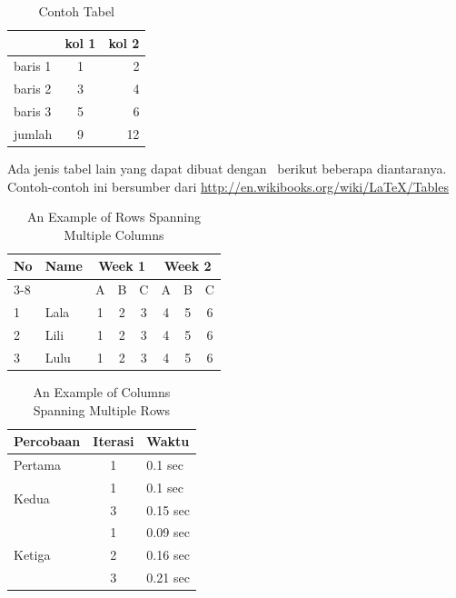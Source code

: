 \begin{table}
	\centering
	\caption{Contoh Tabel}
	\label{tab:tab1}
	\begin{tabular}{| l | c r |}
		\hline
		& kol 1 & kol 2 \\ 
		\hline
		baris 1 & 1 & 2 \\
		baris 2 & 3 & 4 \\
		baris 3 & 5 & 6 \\
		jumlah  & 9 & 12 \\
		\hline
	\end{tabular}
\end{table}

Ada jenis tabel lain yang dapat dibuat dengan \latex~berikut 
beberapa diantaranya. 
Contoh-contoh ini bersumber dari 
\url{http://en.wikibooks.org/wiki/LaTeX/Tables}

\begin{table}
	\centering
	\caption{An Example of Rows Spanning Multiple Columns}
	\label{row.spanning}
	\begin{tabular}{|l|l|*{6}{c|}}
  		\hline %
  		No & Name & \multicolumn{3}{|c|}{Week 1} & \multicolumn{3}{|c|}{Week 2} \\
  		\cline{3-8} %
  		& & A & B & C & A & B & C\\
  		\hline
  		1 & Lala & 1 & 2 & 3 & 4 & 5 & 6\\
  		2 & Lili & 1 & 2 & 3 & 4 & 5 & 6\\
  		3 & Lulu & 1 & 2 & 3 & 4 & 5 & 6\\
  		\hline
	\end{tabular}
\end{table}

\begin{table}
	\centering
	\caption{An Example of Columns Spanning Multiple Rows}
	\label{column.spanning}
	\begin{tabular}{|l|c|l|}
		\hline
		Percobaan & Iterasi & Waktu \\
		\hline
		Pertama & 1 & 0.1 sec \\ \hline
		\multirow{2}{*}{Kedua} & 1 & 0.1 sec \\
 		& 3 & 0.15 sec \\ 
 		\hline
		\multirow{3}{*}{Ketiga} & 1 & 0.09 sec \\
 		& 2 & 0.16 sec \\
 		& 3 & 0.21 sec \\ 
 		\hline
	\end{tabular}
\end{table}

